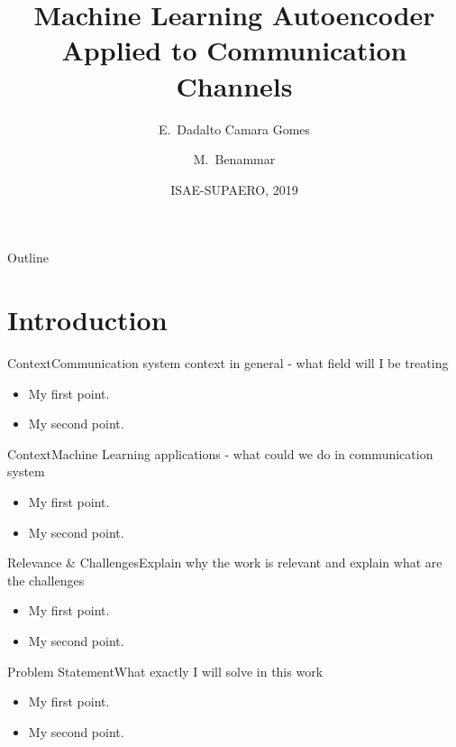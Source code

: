 \documentclass{beamer}
\title[Machine Learning and Communication]{Machine Learning Autoencoder Applied to Communication Channels}
\author{E.~Dadalto Camara Gomes\inst{1} \and M.~Benammar\inst{2}}
\institute[] %
{
  \inst{1}%
   ISAE-SUPAERO\\
   Université de Toulouse\\
    31055, Toulouse, France\\
Email: eduardo.dadalto-camara-gomes@student.isae-supaero.fr
  \and
  \inst{2}%
  Department of Electronics, Optronics, and Signal processing\\
  ISAE-SUPAERO\\
  31055, Toulouse, France\\
  Email: meryem.benammar@isae-supaero.fr}
\date{ISAE-SUPAERO, 2019}
\begin{document}
\begin{frame}
  \titlepage
\end{frame}

\begin{frame}{Outline}
  \tableofcontents
\end{frame}

\section{Introduction}

\begin{frame}{Context}{Communication system context in general - what field will I be treating}
  \begin{itemize}
  \item {
    My first point.
  }
  \item {
    My second point.
  }
  \end{itemize}
\end{frame}


\begin{frame}{Context}{Machine Learning applications - what could we do in communication system}
  \begin{itemize}
  \item {
    My first point.
  }
  \item {
    My second point.
  }
  \end{itemize}
\end{frame}

\begin{frame}{Relevance \& Challenges}{Explain why the work is relevant and explain what are the challenges}
  \begin{itemize}
  \item {
    My first point.
  }
  \item {
    My second point.
  }
  \end{itemize}
\end{frame}

\begin{frame}{Problem Statement}{What exactly I will solve in this work}
  \begin{itemize}
  \item {
    My first point.
  }
  \item {
    My second point.
  }
  \end{itemize}
\end{frame}
\end{document}
